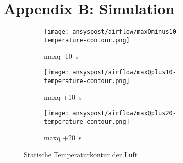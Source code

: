 


\section*{Appendix B: Simulation}\label{Anh:simulation}

\begin{figure}[H]
    \centering

    \begin{subfigure}{\textwidth}
        \centering
        \texttt{[image: ansyspost/airflow/maxQminus10-temperature-contour.png]}
        \caption{\ac{maxq} -\SI{10}{\second}}
        \label{fig:maxQminus10_temp_contour}
    \end{subfigure}

    \begin{subfigure}{\textwidth}
        \centering
        \texttt{[image: ansyspost/airflow/maxQplus10-temperature-contour.png]}
        \caption{\ac{maxq} +\SI{10}{\second}}
        \label{fig:maxQplus10_temp_contour}
    \end{subfigure}

    \begin{subfigure}{\textwidth}
        \centering
        \texttt{[image: ansyspost/airflow/maxQplus20-temperature-contour.png]}
        \caption{\ac{maxq} +\SI{20}{\second}}
        \label{fig:maxQplus20_temp_contour}
    \end{subfigure}

    \caption{Statische Temperaturkontur der Luft}
    \label{fig:airflow_temp_contour_continued}
\end{figure}

